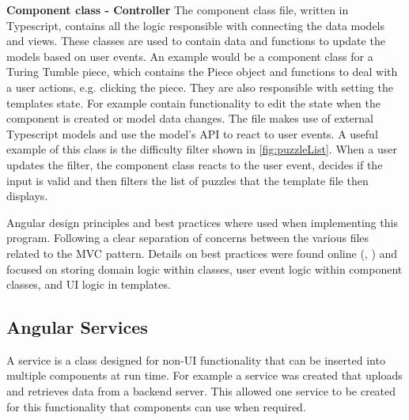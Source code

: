 \documentclass{l4proj}
\begin{document}

\textbf{Component class - Controller}
The component class file, written in Typescript, contains all the logic responsible with connecting the data models and views. These classes are used to contain data and functions to update the models based on user events.  An example would be a component class for a Turing Tumble piece, which contains the Piece object and functions to deal with a user actions, e.g. clicking the piece. They are also responsible with setting the templates state. For example contain functionality to edit the state when the component is created or model data changes. The file makes use of external Typescript models and use the model's API to react to user events. A useful example of this class is the difficulty filter shown in \ref{fig:puzzleList}. When a user updates the filter, the component class reacts to the user event, decides if the input is valid and then filters the list of puzzles that the template file then displays.

Angular design principles and best practices where used when implementing this program. Following a clear separation of concerns between the various files related to the MVC pattern. Details on best practices were found online (\cite{angular_practices}, \cite{freeman_pro_2017}) and focused on storing domain logic within classes, user event logic within component classes, and UI logic in templates.

\subsection{Angular Services}
A service is a class designed for non-UI functionality that can be inserted into multiple components at run time. For example a service was created that uploads and retrieves data from a backend server. This allowed one service to be created for this functionality that components can use when required. 
\end{document}

